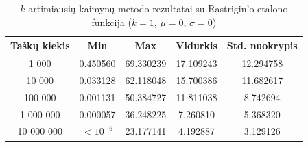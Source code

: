 \begin{table}[H]
    \centering
    \begin{tabular}{|c|c|c|c|c|}
        \hline
        \textbf{Taškų kiekis} & \textbf{Min} & \textbf{Max} & \textbf{Vidurkis} & \textbf{Std. nuokrypis} \\ \hline
        1 000        & 0.450560 & 69.330239 & 17.109243 & 12.294758 \\ \hline
        10 000       & 0.033128 & 62.118048 & 15.700386 & 11.682617 \\ \hline
        100 000      & 0.001131 & 50.384727 & 11.811038 & 8.742694 \\ \hline
        1 000 000    & 0.000057 & 36.248225 & 7.260810 & 5.368320 \\ \hline
        10 000 000   & $<10^{-6}$ & 23.177141 & 4.192887 & 3.129126 \\ \hline
    \end{tabular}
    \caption{$k$ artimiausių kaimynų metodo rezultatai su Rastrigin'o etalono funkcija ($k = 1$, $\mu = 0$, $\sigma = 0$)}
\end{table}